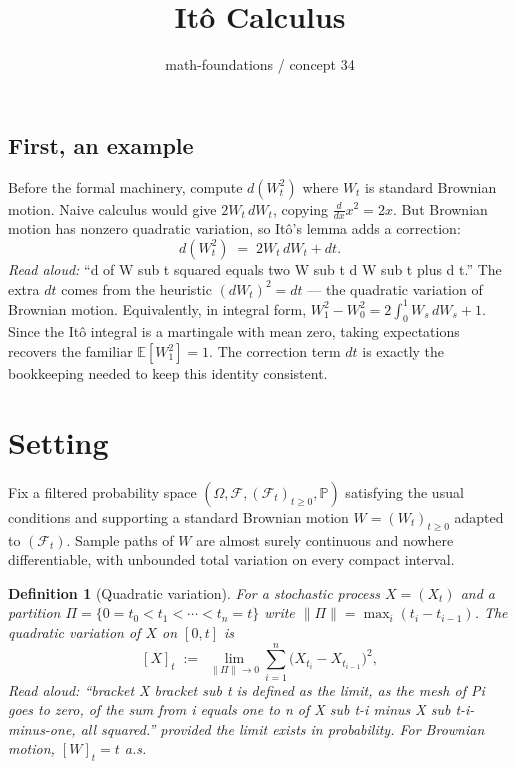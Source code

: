 \documentclass[11pt]{article}
\title{It\^o Calculus}
\author{math-foundations / concept 34}
\date{}
\newtheorem{definition}[theorem]{Definition}
\begin{document}
\maketitle

\subsection*{First, an example}

Before the formal machinery, compute $d(W_t^2)$ where $W_t$ is standard Brownian motion.
Naive calculus would give $2 W_t \, dW_t$, copying $\frac{d}{dx} x^2 = 2x$. But Brownian motion
has nonzero quadratic variation, so It\^o's lemma adds a correction:
\[
  d(W_t^2) \;=\; 2 W_t \, dW_t + dt.
\]
\emph{Read aloud:} ``d of W sub t squared equals two W sub t d W sub t plus d t.''
The extra $dt$ comes from the heuristic $(dW_t)^2 = dt$ --- the quadratic variation of Brownian
motion. Equivalently, in integral form, $W_1^2 - W_0^2 = 2\int_0^1 W_s \, dW_s + 1$. Since the
It\^o integral is a martingale with mean zero, taking expectations recovers the familiar
$\mathbb{E}[W_1^2] = 1$. The correction term $dt$ is exactly the bookkeeping needed to keep
this identity consistent.

\section{Setting}

Fix a filtered probability space $(\Omega, \mathcal{F}, (\mathcal{F}_t)_{t\geq 0}, \mathbb{P})$
satisfying the usual conditions and supporting a standard Brownian motion $W = (W_t)_{t\geq 0}$
adapted to $(\mathcal{F}_t)$. Sample paths of $W$ are almost surely continuous and nowhere
differentiable, with unbounded total variation on every compact interval.

\begin{definition}[Quadratic variation]
For a stochastic process $X = (X_t)$ and a partition $\Pi = \{0 = t_0 < t_1 < \cdots < t_n = t\}$
write $\|\Pi\| = \max_i (t_i - t_{i-1})$. The \emph{quadratic variation} of $X$ on $[0,t]$ is
\[
  [X]_t \;:=\; \lim_{\|\Pi\|\to 0} \sum_{i=1}^n \bigl(X_{t_i} - X_{t_{i-1}}\bigr)^2,
\]
\emph{Read aloud:} ``bracket X bracket sub t is defined as the limit, as the mesh of Pi goes to zero, of the sum from i equals one to n of X sub t-i minus X sub t-i-minus-one, all squared.''
provided the limit exists in probability. For Brownian motion, $[W]_t = t$ a.s.
\end{definition}
\end{document}
